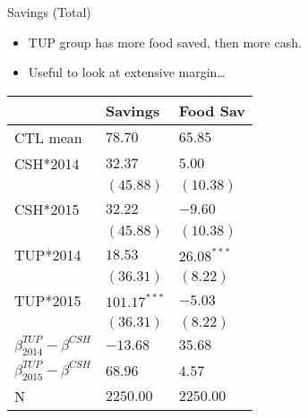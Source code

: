 \documentclass[t,presentation]{beamer}
\begin{document}
\begin{frame}[label={sec:orgheadline15}]{Savings (Total)}
\begin{itemize}
\item TUP group has more food saved, then more cash.
\item Useful to look at extensive margin\ldots{}
\end{itemize}

\begin{center}
\begin{tabular}{lll}
\hline
 & Savings & Food Sav\\
\hline
CTL mean & \(78.70\) & \(65.85\)\\
\hline
CSH*2014 & \(32.37\) & \(5.00\)\\
 & \((45.88)\) & \((10.38)\)\\
CSH*2015 & \(32.22\) & \(-9.60\)\\
 & \((45.88)\) & \((10.38)\)\\
TUP*2014 & \(18.53\) & \(26.08^{***}\)\\
 & \((36.31)\) & \(( 8.22)\)\\
TUP*2015 & \(101.17^{***}\) & \(-5.03\)\\
 & \((36.31)\) & \(( 8.22)\)\\
\hline
\(\beta^{TUP}_{2014}-\beta^{CSH}\) & \(-13.68\) & \(35.68\)\\
\(\beta^{TUP}_{2015}-\beta^{CSH}\) & \(68.96\) & \(4.57\)\\
N & \(2250.00\) & \(2250.00\)\\
\hline
\end{tabular}
\end{center}
\end{frame}
\end{document}
